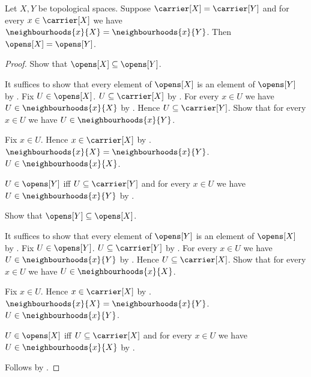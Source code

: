 \begin{theorem}\label{equal_neighbourhood_filters_determine_opens}
    Let $X,Y$ be topological spaces.
    Suppose $\carrier[X]=\carrier[Y]$ and
        for every $x\in\carrier[X]$ we have
        $\neighbourhoods{x}{X}=\neighbourhoods{x}{Y}$.
    Then $\opens[X]=\opens[Y]$.
\end{theorem}
\begin{proof}
    Show that $\opens[X]\subseteq\opens[Y]$.
    \begin{subproof}
        It suffices to show that every element of $\opens[X]$ is an element
            of $\opens[Y]$ by .
        Fix $U\in\opens[X]$.
        $U\subseteq\carrier[X]$ by .
        For every $x\in U$ we have $U\in\neighbourhoods{x}{X}$ by
            .
        Hence $U\subseteq\carrier[Y]$.
        Show that for every $x\in U$ we have
            $U\in\neighbourhoods{x}{Y}$.
        \begin{subproof}
            Fix $x\in U$.
            Hence $x\in\carrier[X]$ by .
            $\neighbourhoods{x}{X}=\neighbourhoods{x}{Y}$.
            $U\in\neighbourhoods{x}{X}$.
        \end{subproof}
        $U\in\opens[Y]$ iff
            $U\subseteq\carrier[Y]$ and
            for every $x\in U$ we have $U\in\neighbourhoods{x}{Y}$ by
            .
    \end{subproof}

    Show that $\opens[Y]\subseteq\opens[X]$.
    \begin{subproof}
        It suffices to show that every element of $\opens[Y]$ is an element
            of $\opens[X]$ by .
        Fix $U\in\opens[Y]$.
        $U\subseteq\carrier[Y]$ by .
        For every $x\in U$ we have $U\in\neighbourhoods{x}{Y}$ by
            .
        Hence $U\subseteq\carrier[X]$.
        Show that for every $x\in U$ we have
            $U\in\neighbourhoods{x}{X}$.
        \begin{subproof}
            Fix $x\in U$.
            Hence $x\in\carrier[X]$ by .
            $\neighbourhoods{x}{X}=\neighbourhoods{x}{Y}$.
            $U\in\neighbourhoods{x}{Y}$.
        \end{subproof}
        $U\in\opens[X]$ iff
            $U\subseteq\carrier[X]$ and
            for every $x\in U$ we have $U\in\neighbourhoods{x}{X}$ by
            .
    \end{subproof}
    Follows by .
\end{proof}

